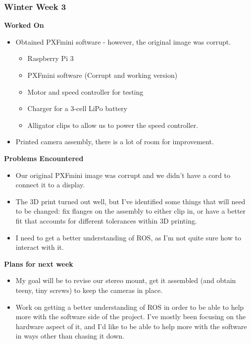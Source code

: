 \documentclass[compsoc,draftclsnofoot,onecolumn,10pt]{IEEEtran}
\begin{document}
\subsubsection*{Winter Week 3}
\textbf{Worked On}
\begin{itemize}
    \item Obtained PXFmini software - however, the original image was corrupt.
    \begin{itemize}
        \item Raspberry Pi 3
        \item PXFmini software (Corrupt and working version)
        \item Motor and speed controller for testing
        \item Charger for a 3-cell LiPo battery
        \item Alligator clips to allow us to power the speed controller.
    \end{itemize}
    \item Printed camera assembly, there is a lot of room for improvement.
\end{itemize}
\textbf{Problems Encountered}
\begin{itemize}
    \item Our original PXFmini image was corrupt and we didn't have a cord to connect it to a display.
    \item The 3D print turned out well, but I've identified some things that will need to be changed: fix flanges on the assembly to either clip in, or have a better fit that accounts for different tolerances within 3D printing.
    \item I need to get a better understanding of ROS, as I'm not quite sure how to interact with it.
\end{itemize}
\textbf{Plans for next week}
\begin{itemize}
    \item My goal will be to revise our stereo mount, get it assembled (and obtain teeny, tiny screws) to keep the cameras in place.
    \item Work on getting a better understanding of ROS in order to be able to help more with the software side of the project. I've mostly been focusing on the hardware aspect of it, and I'd like to be able to help more with the software in ways other than chasing it down.
\end{itemize}
\end{document}
